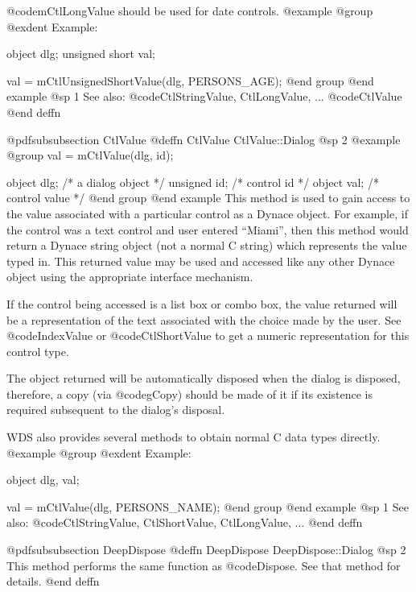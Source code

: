 @code{mCtlLongValue} should be used for date controls.
@example
@group
@exdent Example:

object  dlg;
unsigned short  val;

val = mCtlUnsignedShortValue(dlg, PERSONS_AGE);
@end group
@end example
@sp 1
See also:  @code{CtlStringValue, CtlLongValue, ...}
        @code{CtlValue}
@end deffn














@pdfsubsubsection {CtlValue}
@deffn {CtlValue} CtlValue::Dialog
@sp 2
@example
@group
val = mCtlValue(dlg, id);

object  dlg;    /*  a dialog object  */
unsigned id;    /*  control id       */
object  val;    /*  control value    */
@end group
@end example
This method is used to gain access to the value associated with a
particular control as a Dynace object.  For example, if the control
was a text control and user entered ``Miami'', then this method
would return a Dynace string object (not a normal C string) which
represents the value typed in.  This returned value may be used
and accessed like any other Dynace object using the appropriate
interface mechanism.

If the control being accessed is a list box or combo box, the value
returned will be a representation of the text associated with the choice
made by the user.  See @code{IndexValue} or @code{CtlShortValue} to get
a numeric representation for this control type.

The object returned will be automatically disposed when the dialog is
disposed, therefore, a copy (via @code{gCopy}) should be made of it if
its existence is required subsequent to the dialog's disposal.

WDS also provides several methods to obtain normal C data types directly.
@example
@group
@exdent Example:

object  dlg, val;

val = mCtlValue(dlg, PERSONS_NAME);
@end group
@end example
@sp 1
See also:  @code{CtlStringValue, CtlShortValue, CtlLongValue, ...}
@end deffn












@pdfsubsubsection {DeepDispose}
@deffn {DeepDispose} DeepDispose::Dialog
@sp 2
This method performs the same function as @code{Dispose}.  See that
method for details.
@end deffn









